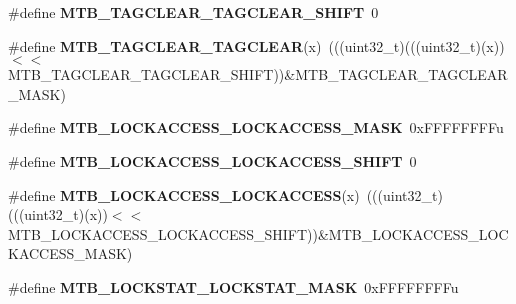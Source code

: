 \begin{DoxyCompactItemize}
\item 
\mbox{\label{group___m_t_b___register___masks_gac1ba97e3448e183a4d00b63060786290}} 
\#define {\bfseries M\+T\+B\+\_\+\+T\+A\+G\+C\+L\+E\+A\+R\+\_\+\+T\+A\+G\+C\+L\+E\+A\+R\+\_\+\+S\+H\+I\+FT}~0
\item 
\mbox{\label{group___m_t_b___register___masks_ga2a3e47e7cacd4d3812c5371fd6d3fa0b}} 
\#define {\bfseries M\+T\+B\+\_\+\+T\+A\+G\+C\+L\+E\+A\+R\+\_\+\+T\+A\+G\+C\+L\+E\+AR}(x)~(((uint32\+\_\+t)(((uint32\+\_\+t)(x))$<$$<$M\+T\+B\+\_\+\+T\+A\+G\+C\+L\+E\+A\+R\+\_\+\+T\+A\+G\+C\+L\+E\+A\+R\+\_\+\+S\+H\+I\+FT))\&M\+T\+B\+\_\+\+T\+A\+G\+C\+L\+E\+A\+R\+\_\+\+T\+A\+G\+C\+L\+E\+A\+R\+\_\+\+M\+A\+SK)
\item 
\mbox{\label{group___m_t_b___register___masks_ga44e6720b612450d08ba896ca1ad61185}} 
\#define {\bfseries M\+T\+B\+\_\+\+L\+O\+C\+K\+A\+C\+C\+E\+S\+S\+\_\+\+L\+O\+C\+K\+A\+C\+C\+E\+S\+S\+\_\+\+M\+A\+SK}~0x\+F\+F\+F\+F\+F\+F\+F\+Fu
\item 
\mbox{\label{group___m_t_b___register___masks_ga7417a26e29a0d9667c59ce74044f210b}} 
\#define {\bfseries M\+T\+B\+\_\+\+L\+O\+C\+K\+A\+C\+C\+E\+S\+S\+\_\+\+L\+O\+C\+K\+A\+C\+C\+E\+S\+S\+\_\+\+S\+H\+I\+FT}~0
\item 
\mbox{\label{group___m_t_b___register___masks_ga02368a1bc86c6a5cbc793233ee314147}} 
\#define {\bfseries M\+T\+B\+\_\+\+L\+O\+C\+K\+A\+C\+C\+E\+S\+S\+\_\+\+L\+O\+C\+K\+A\+C\+C\+E\+SS}(x)~(((uint32\+\_\+t)(((uint32\+\_\+t)(x))$<$$<$M\+T\+B\+\_\+\+L\+O\+C\+K\+A\+C\+C\+E\+S\+S\+\_\+\+L\+O\+C\+K\+A\+C\+C\+E\+S\+S\+\_\+\+S\+H\+I\+FT))\&M\+T\+B\+\_\+\+L\+O\+C\+K\+A\+C\+C\+E\+S\+S\+\_\+\+L\+O\+C\+K\+A\+C\+C\+E\+S\+S\+\_\+\+M\+A\+SK)
\item 
\mbox{\label{group___m_t_b___register___masks_ga8844dcbc4d3c0a3dcbb3ced21e84b950}} 
\#define {\bfseries M\+T\+B\+\_\+\+L\+O\+C\+K\+S\+T\+A\+T\+\_\+\+L\+O\+C\+K\+S\+T\+A\+T\+\_\+\+M\+A\+SK}~0x\+F\+F\+F\+F\+F\+F\+F\+Fu
\item 
\mbox{\label{group___m_t_b___register___masks_ga198cb66f9e01cde28d71dfab52f7b66c}} 

\end{DoxyCompactItemize}
